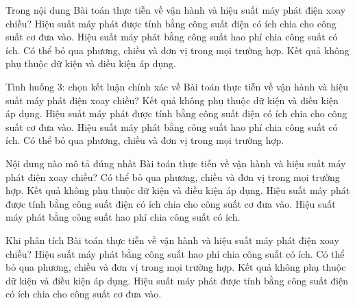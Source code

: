 \begin{ex}
Trong nội dung Bài toán thực tiễn về vận hành và hiệu suất máy phát điện xoay chiều?
\choice
{\True Hiệu suất máy phát được tính bằng công suất điện có ích chia cho công suất cơ đưa vào.}
{Hiệu suất máy phát bằng công suất hao phí chia công suất có ích.}
{Có thể bỏ qua phương, chiều và đơn vị trong mọi trường hợp.}
{Kết quả không phụ thuộc dữ kiện và điều kiện áp dụng.}
\end{ex}

\begin{ex}
Tình huống 3: chọn kết luận chính xác về Bài toán thực tiễn về vận hành và hiệu suất máy phát điện xoay chiều?
\choice
{Kết quả không phụ thuộc dữ kiện và điều kiện áp dụng.}
{\True Hiệu suất máy phát được tính bằng công suất điện có ích chia cho công suất cơ đưa vào.}
{Hiệu suất máy phát bằng công suất hao phí chia công suất có ích.}
{Có thể bỏ qua phương, chiều và đơn vị trong mọi trường hợp.}
\end{ex}

\begin{ex}
Nội dung nào mô tả đúng nhất Bài toán thực tiễn về vận hành và hiệu suất máy phát điện xoay chiều?
\choice
{Có thể bỏ qua phương, chiều và đơn vị trong mọi trường hợp.}
{Kết quả không phụ thuộc dữ kiện và điều kiện áp dụng.}
{\True Hiệu suất máy phát được tính bằng công suất điện có ích chia cho công suất cơ đưa vào.}
{Hiệu suất máy phát bằng công suất hao phí chia công suất có ích.}
\end{ex}

\begin{ex}
Khi phân tích Bài toán thực tiễn về vận hành và hiệu suất máy phát điện xoay chiều?
\choice
{Hiệu suất máy phát bằng công suất hao phí chia công suất có ích.}
{Có thể bỏ qua phương, chiều và đơn vị trong mọi trường hợp.}
{Kết quả không phụ thuộc dữ kiện và điều kiện áp dụng.}
{\True Hiệu suất máy phát được tính bằng công suất điện có ích chia cho công suất cơ đưa vào.}
\end{ex}

